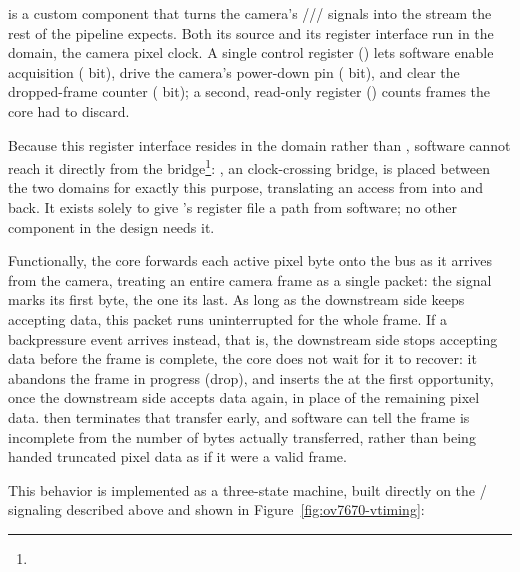  is a custom  component that turns the camera's /// signals into the  stream the rest of the pipeline expects. Both its  source and its  register interface run in the  domain, the camera pixel clock. A single control register () lets software enable acquisition ( bit), drive the camera's power-down pin ( bit), and clear the dropped-frame counter ( bit); a second, read-only register () counts frames the core had to discard.

Because this register interface resides in the  domain rather than , software cannot reach it directly from the  bridge\footnote{}: , an  clock-crossing bridge, is placed between the two domains for exactly this purpose, translating an  access from  into  and back. It exists solely to give 's register file a path from software; no other component in the design needs it.

Functionally, the core forwards each active pixel byte onto the  bus as it arrives from the camera, treating an entire camera frame as a single  packet: the  signal marks its first byte, the  one its last. As long as the downstream side keeps accepting data, this packet runs uninterrupted for the whole frame. If a backpressure event arrives instead, that is, the downstream side stops accepting data before the frame is complete, the core does not wait for it to recover: it abandons the frame in progress (drop), and inserts the  at the first opportunity, once the downstream side accepts data again, in place of the remaining pixel data.  then terminates that transfer early, and software can tell the frame is incomplete from the number of bytes actually transferred, rather than being handed truncated pixel data as if it were a valid frame.

This behavior is implemented as a three-state machine, built directly on the / signaling described above and shown in Figure~\ref{fig:ov7670-vtiming}:

